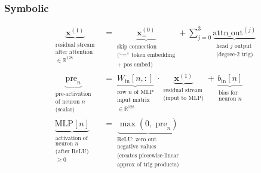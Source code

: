 \documentclass[11pt,a4paper]{article}
\begin{document}
\subsubsection*{Symbolic}
\begin{align}
    \underbrace{\mathbf{x}^{(1)}}_{\substack{\text{residual stream} \\ \text{after attention} \\ \in \mathbb{R}^{128}}} &= \underbrace{\mathbf{x}^{(0)}_=}_{\substack{\text{skip connection} \\ \text{(``='' token embedding} \\ \text{+ pos embed)}}} + \sum_{j=0}^{3} \underbrace{\text{attn\_out}^{(j)}}_{\substack{\text{head } j \text{ output} \\ \text{(degree-2 trig)}}} \\
    \underbrace{\text{pre}_n}_{\substack{\text{pre-activation} \\ \text{of neuron } n \\ \text{(scalar)}}} &= \underbrace{W_{\text{in}}[n, :]}_{\substack{\text{row } n \text{ of MLP} \\ \text{input matrix} \\ \in \mathbb{R}^{128}}} \cdot \underbrace{\mathbf{x}^{(1)}}_{\substack{\text{residual stream} \\ \text{(input to MLP)}}} + \underbrace{b_{\text{in}}[n]}_{\substack{\text{bias for} \\ \text{neuron } n}} \\
    \underbrace{\text{MLP}[n]}_{\substack{\text{activation of} \\ \text{neuron } n \\ \text{(after ReLU)} \\ \geq 0}} &= \underbrace{\max(0,\; \text{pre}_n)}_{\substack{\text{ReLU: zero out} \\ \text{negative values} \\ \text{(creates piecewise-linear} \\ \text{approx of trig products)}}}
\end{align}
\end{document}
